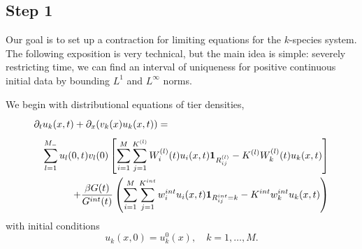 \subsection*{Step 1}
Our goal is to set up a contraction for limiting equations for the $k$-species system.  The following exposition is very technical, but the main idea is simple: severely restricting time, we can find an interval of uniqueness for positive continuous initial data by bounding $L^1$ and $L^\infty$ norms.

  We begin with distributional equations of tier densities,
\begin{eqnarray} 
  \lefteqn{\partial_t u_k(x,t)+\partial_{x}(v_k(x)u_{k}(x,t))=  \phantom{u_j(x,t)\mathbf{1}_{R^{(l)}_{ij}}
-K^{(l)}W_k^{(l)}(t)u_k(x,t)}}\label{smoothsol1}\\
 && \sum_{l = 1}^{M_-}u_l(0,t)v_{l}(0)\left[\sum_{i = 1}^{M}\sum_{j= 1}^{K^{(l)}} W_i^{(l)}(t)u_i(x,t)\mathbf{1}_{R^{(l)}_{ij}}
-K^{(l)}W_k^{(l)}(t)u_k(x,t)\right]\label{smoothsol2}\nonumber\\ 
&&+\frac{\beta G(t)}{G^{int}(t)}\left( \sum_{i = 1}^{M}\sum_{j= 1}^{K^{int}} w^{int} _iu_{i}(x,t)\mathbf{1}_{R^{int}_{ij} = k}-K^{int}w^{int}_ku_{k}(x,t)
 \right)\label{smoothsol3}\nonumber
 \end{eqnarray}
 with initial conditions
 \begin{equation}
u_k(x,0) = u_{k}^0(x), \quad k = 1,\dots, M.
\end{equation}

